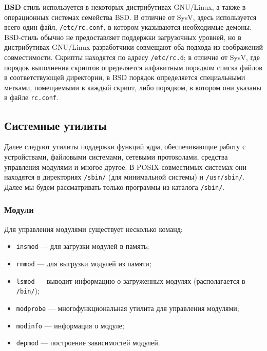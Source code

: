  \textbf{BSD}-стиль используется в некоторых дистрибутивах GNU/Linux, а также в операционных системах семейства BSD. В отличие от SysV, здесь используется всего один файл, \texttt{/etc/rc.conf}, в котором указываются необходимые демоны. BSD-стиль обычно не предоставляет поддержки загрузочных уровней, но в дистрибутивах GNU/Linux разработчики совмещают оба подхода из соображений совместимости.
 Скрипты находятся по адресу \texttt{/etc/rc.d}; в отличие от SysV, где порядок выполнения скриптов определяется алфавитным порядком списка файлов в соответствующей директории, в BSD порядок определяется специальными метками, помещаемыми в каждый скрипт, либо порядком, в котором они указаны в файле \texttt{rc.conf}.
 
\subsection{Системные утилиты}\label{base:os:structure:sysutils}
 Далее следуют утилиты поддержки функций ядра, обеспечивающие работу с устройствами, файловыми системами, сетевыми протоколами, средства управления модулями и многое другое. В POSIX-совместимых системах они находятся в директориях \texttt{/sbin/} (для минимальной системы) и \texttt{/usr/sbin/}. Далее мы будем рассматривать только программы из каталога \texttt{/sbin/}.

\subsubsection{Модули}\label{base:os:structure:sysutils:modules}
 Для управления модулями существует несколько команд:
 \begin{itemize}
  \item \texttt{insmod} --- для загрузки модулей в память;
  \item \texttt{rmmod} --- для выгрузки модулей из памяти;
  \item \texttt{lsmod} --- выводит информацию о загруженных модулях (располагается в \texttt{/bin/});
  \item \texttt{modprobe} --- многофункциональная утилита для управления модулями;
  \item \texttt{modinfo} --- информация о модуле;
  \item \texttt{depmod} --- построение зависимостей модулей.
 \end{itemize}

